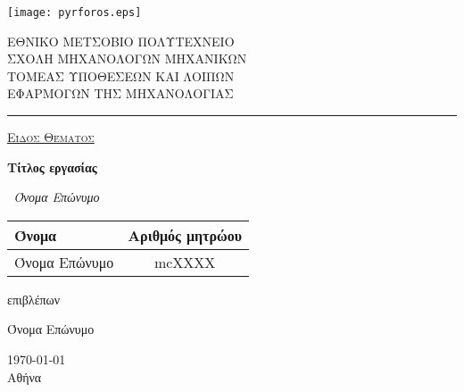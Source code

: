\begin{titlepage}
	\begin{center}
		\begin{minipage}{0.15\textwidth}%
			\texttt{[image: pyrforos.eps]}%
		\end{minipage}\hspace{10pt}
		\begin{minipage}{0.6\textwidth}%
			ΕΘΝΙΚΟ ΜΕΤΣΟΒΙΟ ΠΟΛΥΤΕΧΝΕΙΟ\\
			ΣΧΟΛΗ ΜΗΧΑΝΟΛΟΓΩΝ ΜΗΧΑΝΙΚΩΝ\\
			ΤΟΜΕΑΣ ΥΠΟΘΕΣΕΩΝ ΚΑΙ ΛΟΙΠΩΝ\\
			ΕΦΑΡΜΟΓΩΝ ΤΗΣ ΜΗΧΑΝΟΛΟΓΙΑΣ\\
		\end{minipage}%
	\end{center}

	\par\noindent\rule{\textwidth}{0.8pt}

	\vspace{1cm}
	{\centering

		{\scshape\Large \underline{Είδος Θέματος}\par}
		\vspace{1.5cm}
		{\huge\bfseries Τίτλος εργασίας\par}
		\vspace{2cm}
		{\Large\itshape~Όνομα Επώνυμο\/\par}

		\begin{table}[ht]
			\centering
			\begin{tabular}[H]{lc}
				\toprule
				Όνομα         & Αριθμός μητρώου \\ \midrule \midrule
				Όνομα Επώνυμο & mcΧΧΧΧ          \\
				\bottomrule
			\end{tabular}
		\end{table}

		\vfill
		επιβλέπων\par
		Όνομα Επώνυμο

		\vfill

		\begin{center}
			{\large \today\\ Αθήνα}
		\end{center}
	}
\end{titlepage}

